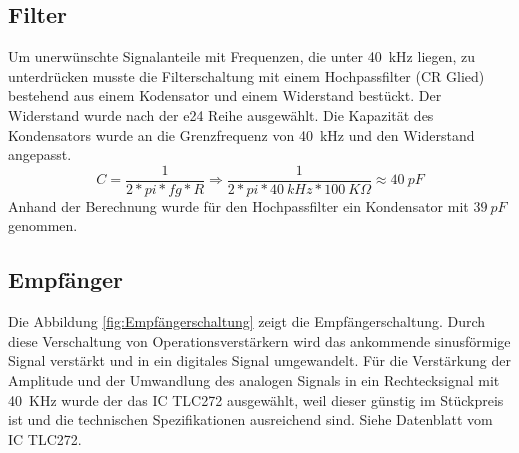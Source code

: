 \subsection{Filter}%
Um unerwünschte Signalanteile mit Frequenzen, die unter 40~kHz liegen, zu unterdrücken musste die Filterschaltung mit einem Hochpassfilter (CR Glied) bestehend aus einem Kodensator und einem Widerstand bestückt. Der Widerstand wurde nach der e24 Reihe ausgewählt.
Die Kapazität des Kondensators wurde an die Grenzfrequenz von 40~kHz und den Widerstand angepasst.
\onehalfspacing \\
\[\displaystyle C=\frac{1}{2*pi*fg*R}\Rightarrow\frac{1}{2*pi*40~kHz*100~K\Omega}\approx40~pF \]
\singlespacing
Anhand der Berechnung wurde für den Hochpassfilter ein Kondensator mit \(\displaystyle 39~pF\) genommen.

\subsection{Empfänger}
Die Abbildung \ref{fig:Empfängerschaltung} zeigt die Empfängerschaltung. Durch diese Verschaltung von Operationsverstärkern wird das ankommende sinusförmige Signal verstärkt und in ein digitales Signal umgewandelt. Für die Verstärkung der Amplitude und der Umwandlung des analogen Signals in ein Rechtecksignal mit 40~KHz wurde der das IC TLC272 ausgewählt, weil dieser günstig im Stückpreis ist und die technischen Spezifikationen ausreichend sind. Siehe Datenblatt vom IC TLC272.\\

